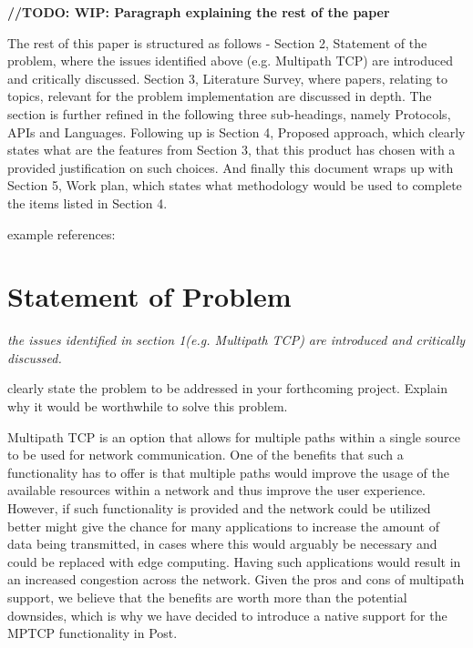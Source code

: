 \documentclass{mprop}
\begin{document}
\textbf{//TODO: WIP: Paragraph explaining the rest of the paper 
}

\qquad The rest of this paper is structured as follows - Section 2, Statement of the problem, where the issues identified above (e.g. Multipath TCP) are introduced and critically discussed. Section 3, Literature Survey, where papers, relating to topics, relevant for the problem implementation are discussed in depth. The section is further refined in the following three sub-headings, namely Protocols, APIs and Languages. Following up is Section 4, Proposed approach, which clearly states what are the features from Section 3, that this product has chosen with a provided justification on such choices. And finally this document wraps up with Section 5, Work plan, which states what methodology would be used to complete the items listed in Section 4.


example references: \cite{BK08}
\pagebreak

\section{Statement of Problem}

\textit{the issues identified in section 1(e.g. Multipath TCP) are introduced and critically 
discussed. 
}

clearly state the problem to be addressed in your forthcoming project. Explain why it would be worthwhile to solve this problem.



\qquad Multipath TCP is an option that allows for multiple paths within a single source to be used for network communication. One of the benefits that such a functionality has to offer is that multiple paths would improve the usage of the available resources within a network and thus improve the user experience. However, if such functionality is provided and the network could be utilized better might give the chance for many applications to increase the amount of data being transmitted, in cases where this would arguably be necessary and could be replaced with edge computing. Having such applications would result in an increased congestion across the network. Given the pros and cons of multipath support, we believe that the benefits are worth more than the potential downsides, which is why we have decided to introduce a native support for  the MPTCP functionality in Post.

\end{document}
